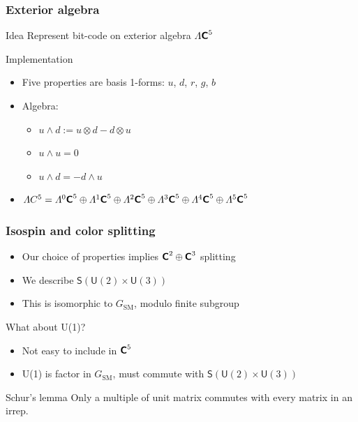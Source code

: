 \documentclass[english, fleqn]{beamer}
\begin{document}
\begin{frame}
    \frametitle{Exterior algebra}

    \begin{block}{Idea}
        Represent bit-code on exterior algebra $\Lambda \text{\bfseries\sffamily{C}}^5$
    \end{block}

    \pause

    \begin{block}{Implementation}
        \begin{itemize}
            \item Five properties are basis 1-forms: $u$, $d$, $r$, $g$, $b$
            \item Algebra:
                \begin{itemize}
                    \item $u \wedge d := u \otimes d - d \otimes u$
                    \item $u \wedge u = 0$
                    \item $u \wedge d = - d \wedge u$
                \end{itemize}
            \item
                $\Lambda C^5 = 
                \Lambda^0 \text{\bfseries\sffamily{C}}^5
                \oplus \Lambda^1 \text{\bfseries\sffamily{C}}^5
                \oplus \Lambda^2 \text{\bfseries\sffamily{C}}^5
                \oplus \Lambda^3 \text{\bfseries\sffamily{C}}^5
                \oplus \Lambda^4 \text{\bfseries\sffamily{C}}^5
                \oplus \Lambda^5 \text{\bfseries\sffamily{C}}^5$
        \end{itemize}
    \end{block}
\end{frame}

\begin{frame}
    \frametitle{Isospin and color splitting}

    \begin{itemize}
        \item Our choice of properties implies $\text{\bfseries\sffamily{C}}^2 \oplus \text{\bfseries\sffamily{C}}^3$ splitting
        \pause
        \item We describe $\mathsf S(\mathsf U(2) \times \mathsf U(3))$
        \pause
        \item This is isomorphic to $G_\text{SM}$, modulo finite subgroup
    \end{itemize}

    \pause

    \begin{alertblock}{What about U(1)?}
        \begin{itemize}
            \item Not easy to include in $\text{\bfseries\sffamily{C}}^5$
            \item U(1) is factor in $G_\text{SM}$, must commute with $\mathsf S(\mathsf U(2) \times \mathsf U(3))$
        \end{itemize}
    \end{alertblock}

    \pause

    \begin{block}{Schur's lemma}
        Only a multiple of unit matrix commutes with every matrix in an irrep.
    \end{block}
\end{frame}
\end{document}
